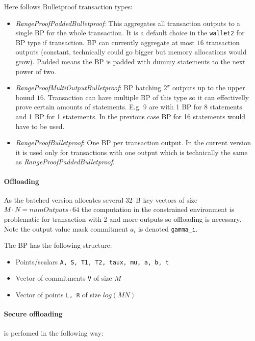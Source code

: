 \documentclass[]{article}
\begin{document}
Here follows Bulletproof transaction types:
\begin{itemize}
	\item {\it RangeProofPaddedBulletproof}: This aggregates all transaction outputs to a single BP for the whole transaction. It is a default choice in the \verb|wallet2| for BP type if transaction. BP can currently aggregate at most $16$ transaction outputs (constant, technically could go bigger but memory allocations would grow). Padded means the BP is padded with dummy statements to the next power of two.
	
	\item {\it RangeProofMultiOutputBulletproof}: BP batching $2^x$ outputs up to the upper bound $16$. Transaction can have multiple BP of this type so it can effectivelly prove certain amounts of statements. E.g. 9 are with 1 BP for 8 statements and 1 BP for 1 statements. In the previous case BP for 16 statements would have to be used.
	
	\item {\it RangeProofBulletproof}: One BP per transaction output. In the current version it is used only for transactions with one output which is technically the same as {\it RangeProofPaddedBulletproof}.
\end{itemize}

\paragraph{Offloading} As the batched version allocates several 32~B key vectors of size $M\cdot N  = numOutputs \cdot 64$ the computation in the constrained environment is problematic for transaction with 2 and more outputs so offloading is necessary. Note the output value mask commitment $a_i$ is denoted \verb|gamma_i|.

The BP has the following structure:
\begin{itemize}
	\item Points/scalars \verb|A, S, T1, T2, taux, mu, a, b, t|
	\item Vector of commitments \verb|V| of size $M$
	\item Vector of points \verb|L, R| of size $log(MN)$
\end{itemize}

\paragraph{Secure offloading} is perfomed in the following way:
\end{document}
